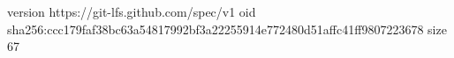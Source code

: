 version https://git-lfs.github.com/spec/v1
oid sha256:ccc179faf38bc63a54817992bf3a22255914e772480d51affc41ff9807223678
size 67
